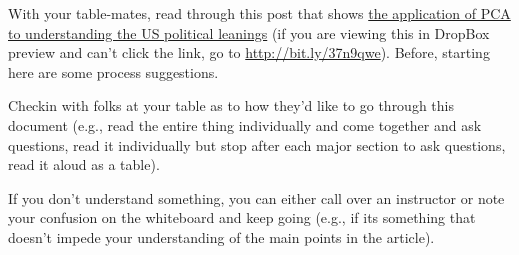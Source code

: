 \begin{prob}
With your table-mates, read through this post that shows \href{https://nycdatascience.com/blog/student-works/figuring-out-american-politics-so-easy-a-computer-can-do-it/}{the application of PCA to understanding the US political leanings} (if you are viewing this in DropBox preview and can't click the link, go to \url{http://bit.ly/37n9qwe}).  Before, starting here are some process suggestions.

\bi
\item Checkin with folks at your table as to how they'd like to go through this document (e.g., read the entire thing individually and come together and ask questions, read it individually but stop after each major section to ask questions, read it aloud as a table).
\item If you don't understand something, you can either call over an instructor or note your confusion on the whiteboard and keep going (e.g., if its something that doesn't impede your understanding of the main points in the article).
\ei

\end{prob}

\pagebreak
\shipoutAnswer

